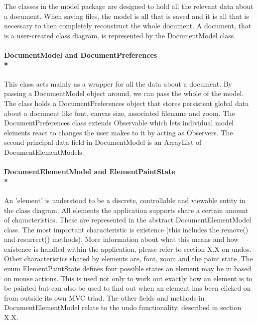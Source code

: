 	
\tab The classes in the model package are designed to hold all the relevant data about a document. When saving files, the model is all that is saved and it is all that is necessary to then completely reconstruct the whole document. A document, that is a user-created class diagram, is represented by the DocumentModel class. 

\paragraph{\small{\tab DocumentModel and DocumentPreferences\\*}}

\hspace{-10pt}This class acts mainly as a wrapper for all the data about a document. By passing a DocumentModel object around, we can pass the whole of the model.  The class holds a DocumentPreferences object that stores persistent global data about a document like font, canvas size, associated filename and zoom. The DocumentPreferences class extends Observable which lets individual model elements react to changes the user makes to it by acting as Observers. The second principal data field in DocumentModel is an ArrayList of DocumentElementModels.

\newpage
% 
\newpage

\paragraph{\small{\tab DocumentElementModel and ElementPaintState\\*}}

\hspace{-10pt}An 'element' is understood to be a discrete, controllable and viewable entity in the class diagram. All elements the application supports share a certain amount of characteristics. These are represented in the abstract DocumentElementModel class. The most important characteristic is existence (this includes the remove() and resurrect() methods). More information about what this means and how existence is handled within the application, please refer to section X.X on undos. Other characteristics shared by elements are, font, zoom and the paint state. The enum ElementPaintState defines four possible states an element may be in based on mouse actions. This is used not only to work out exactly how an element is to be painted but can also be used to find out when an element has been clicked on from outside its own MVC triad. The other fields and methods in DocumentElementModel relate to the undo functionality, described in section X.X.

